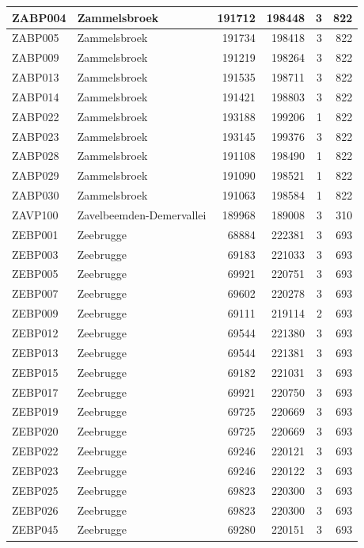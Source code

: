 \documentclass[11pt,]{book}
\begin{document}
\begin{table}
\begin{tabular}[t]{l|l|r|r|r|r}
\hline
ZABP004 & Zammelsbroek & 191712 & 198448 & 3 & 822\\
\hline
ZABP005 & Zammelsbroek & 191734 & 198418 & 3 & 822\\
\hline
ZABP009 & Zammelsbroek & 191219 & 198264 & 3 & 822\\
\hline
ZABP013 & Zammelsbroek & 191535 & 198711 & 3 & 822\\
\hline
ZABP014 & Zammelsbroek & 191421 & 198803 & 3 & 822\\
\hline
ZABP022 & Zammelsbroek & 193188 & 199206 & 1 & 822\\
\hline
ZABP023 & Zammelsbroek & 193145 & 199376 & 3 & 822\\
\hline
ZABP028 & Zammelsbroek & 191108 & 198490 & 1 & 822\\
\hline
ZABP029 & Zammelsbroek & 191090 & 198521 & 1 & 822\\
\hline
ZABP030 & Zammelsbroek & 191063 & 198584 & 1 & 822\\
\hline
ZAVP100 & Zavelbeemden-Demervallei & 189968 & 189008 & 3 & 310\\
\hline
ZEBP001 & Zeebrugge & 68884 & 222381 & 3 & 693\\
\hline
ZEBP003 & Zeebrugge & 69183 & 221033 & 3 & 693\\
\hline
ZEBP005 & Zeebrugge & 69921 & 220751 & 3 & 693\\
\hline
ZEBP007 & Zeebrugge & 69602 & 220278 & 3 & 693\\
\hline
ZEBP009 & Zeebrugge & 69111 & 219114 & 2 & 693\\
\hline
ZEBP012 & Zeebrugge & 69544 & 221380 & 3 & 693\\
\hline
ZEBP013 & Zeebrugge & 69544 & 221381 & 3 & 693\\
\hline
ZEBP015 & Zeebrugge & 69182 & 221031 & 3 & 693\\
\hline
ZEBP017 & Zeebrugge & 69921 & 220750 & 3 & 693\\
\hline
ZEBP019 & Zeebrugge & 69725 & 220669 & 3 & 693\\
\hline
ZEBP020 & Zeebrugge & 69725 & 220669 & 3 & 693\\
\hline
ZEBP022 & Zeebrugge & 69246 & 220121 & 3 & 693\\
\hline
ZEBP023 & Zeebrugge & 69246 & 220122 & 3 & 693\\
\hline
ZEBP025 & Zeebrugge & 69823 & 220300 & 3 & 693\\
\hline
ZEBP026 & Zeebrugge & 69823 & 220300 & 3 & 693\\
\hline
ZEBP045 & Zeebrugge & 69280 & 220151 & 3 & 693\\

\end{tabular}
\end{table}
\end{document}
